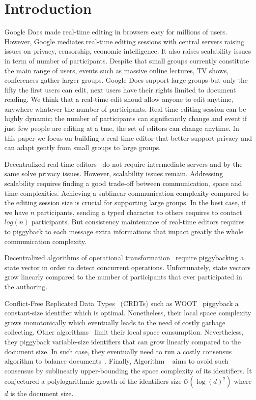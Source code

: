
\section{Introduction}

Google Docs made real-time editing in browsers easy for millions of
users. However, Google mediates real-time editing sessions with
central servers raising issues on privacy, censorship, economic
intelligence. It also raises scalability issues in term of number of
participants.  Despite that small groups currently constitute the main
range of users, events such as massive online lectures, TV shows,
conferences gather larger groups.  Google Docs support large groups
but only the fifty the first users can edit, next users have their rights
limited to document reading. We think that a real-time edit shoud
allow anyone to edit anytime, anywhere whatever the number of
participants. Real-time editing session can be highly dynamic; the number of
participants can significantly change and event if just few people are
editing at a tme, the set of editors can change anytime. In this paper
we focus on building a real-time editor that better support privacy
and can adapt gently from small groups to large groups.

Decentralized real-time editors~\cite{oster2006data,
  sun1998operational, sun2009contextbased} do not require intermediate
servers and by the same solve privacy issues. However, scalability
issues remain.  Addressing scalability requires finding a good
trade-off between communication, space and time
complexities. Achieving a sublinear communication complexity compared
to the editing session size is crucial for supporting large groups. In
the best case, if we have $n$ participants, sending a typed character to
others requires to contact $log(n)$ participants. But consistency
maintenance of real-time editors requires to piggyback to each
message extra informations that impact greatly the whole communication
complexity.

Decentralized algorithms of operational
transformation~\cite{sun2009contextbased} require piggybacking a state
vector in order to detect concurrent operations. Unfortunately, state
vectors grow linearly compared to the number of participants that ever
participated in the authoring.

Conflict-Free Replicated Data Types~\cite{shapiro2011comprehensive}
(CRDTs) such as WOOT~\cite{oster2006data} piggyback a constant-size
identifier which is optimal. Nonetheless, their local space complexity
grows monotonically which eventually leads to the need of costly
garbage collecting. Other algorithms~\cite{preguica2009commutative,
  weiss2010logootundo} limit their local space
consumption. Nevertheless, they piggyback variable-size identifiers
that can grow linearly compared to the document size. In such case,
they eventually need to run a costly consensus algorithm to balance
documents~\cite{zawirski2011asynchronous}. Finally, Algorithm
\LSEQ~\cite{nedelec2013concurrency} aims to avoid such consensus by
sublinearly upper-bounding the space complexity of its identifiers. It
conjectured a polylogarithmic growth of the identifiers size
$\mathcal{O}(\log(d)^2)$ where $d$ is the document size.

